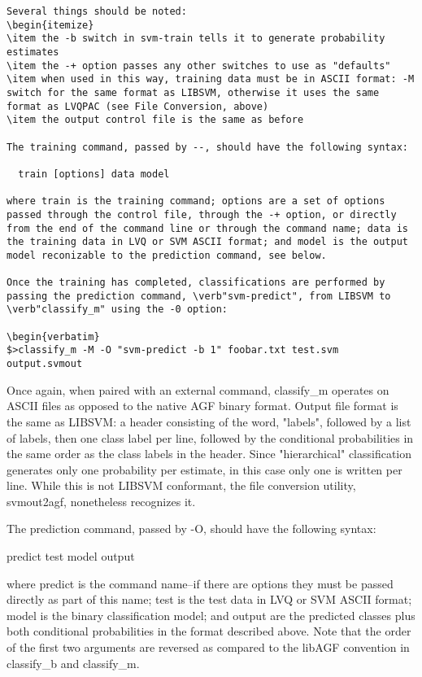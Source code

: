 \documentclass[12pt]{article}
\begin{document}
\begin{list}
\begin{verbatim}
Several things should be noted:
\begin{itemize}
\item the -b switch in svm-train tells it to generate probability estimates
\item the -+ option passes any other switches to use as "defaults"
\item when used in this way, training data must be in ASCII format: -M switch for the same format as LIBSVM, otherwise it uses the same format as LVQPAC (see File Conversion, above)
\item the output control file is the same as before

The training command, passed by --, should have the following syntax:

  train [options] data model

where train is the training command; options are a set of options passed through the control file, through the -+ option, or directly from the end of the command line or through the command name; data is the training data in LVQ or SVM ASCII format; and model is the output model reconizable to the prediction command, see below.

Once the training has completed, classifications are performed by passing the prediction command, \verb"svm-predict", from LIBSVM to \verb"classify_m" using the -0 option:

\begin{verbatim}
$>classify_m -M -O "svm-predict -b 1" foobar.txt test.svm output.svmout
\end{verbatim}

Once again, when paired with an external command, classify_m operates on ASCII files as opposed to the native AGF binary format. Output file format is the same as LIBSVM: a header consisting of the word, "labels", followed by a list of labels, then one class label per line, followed by the conditional probabilities in the same order as the class labels in the header. Since "hierarchical" classification generates only one probability per estimate, in this case only one is written per line.  While this is not LIBSVM conformant, the file conversion utility, svmout2agf, nonetheless recognizes it.  

The prediction command, passed by -O, should have the following syntax:

  predict test model output

where predict is the command name--if there are options they must be passed directly as part of this name; test is the test data in LVQ or SVM ASCII format; model is the binary classification model; and output are the predicted classes plus both conditional probabilities in the format described above.  Note that the order of the first two arguments are reversed as compared to the libAGF convention in classify_b and classify_m.


\end{list}
\end{document}
